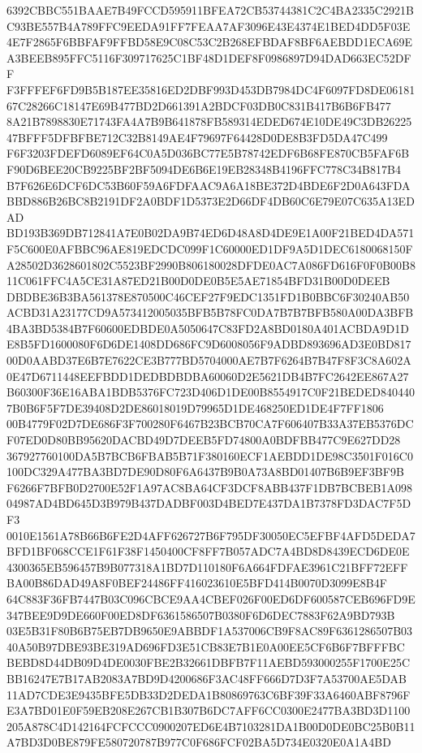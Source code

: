 \documentclass[UTF8,fontset=fandol,zihao=-4,a4paper]{ctexart}
\begin{document}
{{6392CBBC551BAAE7B49FCCD595911BFEA72CB53744381C2C4BA2335C2921BC93BE557B4A789FFC9EEDA91FF7FEAA7AF3096E43E4374E1BED4DD5F03E
4E7F2865F6BBFAF9FFBD58E9C08C53C2B268EFBDAF8BF6AEBDD1ECA69EA3BEEB895FFC5116F309717625C1BF48D1DEF8F0986897D94DAD663EC52DFF
F3FFFEF6FD9B5B187EE35816ED2DBF993D453DB7984DC4F6097FD8DE0618167C28266C18147E69B477BD2D661391A2BDCF03DB0C831B417B6B6FB477
8A21B7898830E71743FA4A7B9B641878FB589314EDED674E10DE49C3DB2622547BFFF5DFBFBE712C32B8149AE4F79697F64428D0DE8B3FD5DA47C499
F6F3203FDEFD6089EF64C0A5D036BC77E5B78742EDF6B68FE870CB5FAF6BF90D6BEE20CB9225BF2BF5094DE6B6E19EB28348B4196FFC778C34B817B4
B7F626E6DCF6DC53B60F59A6FDFAAC9A6A18BE372D4BDE6F2D0A643FDABBD886B26BC8B2191DF2A0BDF1D5373E2D66DF4DB60C6E79E07C635A13EDAD
BD193B369DB712841A7E0B02DA9B74ED6D48A8D4DE9E1A00F21BED4DA571F5C600E0AFBBC96AE819EDCDC099F1C60000ED1DF9A5D1DEC6180068150F
A28502D3628601802C5523BF2990B806180028DFDE0AC7A086FD616F0F0B00B811C061FFC4A5CE31A87ED21B00D0DE0B5E5AE71854BFD31B00D0DEEB
DBDBE36B3BA561378E870500C46CEF27F9EDC1351FD1B0BBC6F30240AB50ACBD31A23177CD9A573412005035BFB5B78FC0DA7B7B7BFB580A00DA3BFB
4BA3BD5384B7F60600EDBDE0A5050647C83FD2A8BD0180A401ACBDA9D1DE8B5FD1600080F6D6DE1408DD686FC9D6008056F9ADBD893696AD3E0BD817
00D0AABD37E6B7E7622CE3B777BD5704000AE7B7F6264B7B47F8F3C8A602A0E47D6711448EEFBDD1DEDBDBDBA60060D2E5621DB4B7FC2642EE867A27
B60300F36E16ABA1BDB5376FC723D406D1DE00B8554917C0F21BEDED8404407B0B6F5F7DE39408D2DE86018019D79965D1DE468250ED1DE4F7FF1806
00B4779F02D7DE686F3F700280F6467B23BCB70CA7F606407B33A37EB5376DCF07ED0D80BB95620DACBD49D7DEEB5FD74800A0BDFBB477C9E627DD28
367927760100DA5B7BCB6FBAB5B71F380160ECF1AEBDD1DE98C3501F016C0100DC329A477BA3BD7DE90D80F6A6437B9B0A73A8BD01407B6B9EF3BF9B
F6266F7BFB0D2700E52F1A97AC8BA64CF3DCF8ABB437F1DB7BCBEB1A09804987AD4BD645D3B979B437DADBF003D4BED7E437DA1B7378FD3DAC7F5DF3
0010E1561A78B66B6FE2D4AFF626727B6F795DF30050EC5EFBF4AFD5DEDA7BFD1BF068CCE1F61F38F1450400CF8FF7B057ADC7A4BD8D8439ECD6DE0E
4300365EB596457B9B077318A1BD7D110180F6A664FDFAE3961C21BFF72EFFBA00B86DAD49A8F0BEF24486FF416023610E5BFD414B0070D3099E8B4F
64C883F36FB7447B03C096CBCE9AA4CBEF026F00ED6DF600587CEB696FD9E347BEE9D9DE660F00ED8DF6361586507B0380F6D6DEC7883F62A9BD793B
03E5B31F80B6B75EB7DB9650E9ABBDF1A537006CB9F8AC89F6361286507B0340A50B97DBE93BE319AD696FD3E51CB83E7B1E0A00EE5CF6B6F7BFFFBC
BEBD8D44DB09D4DE0030FBE2B32661DBFB7F11AEBD593000255F1700E25CBB16247E7B17AB2083A7BD9D4200686F3AC48FF666D7D3F7A53700AE5DAB
11AD7CDE3E9435BFE5DB33D2DEDA1B80869763C6BF39F33A6460ABF8796FE3A7BD01E0F59EB208E267CB1B307B6DC7AFF6CC0300E2477BA3BD3D1100
205A878C4D142164FCFCCC0900207ED6E4B7103281DA1B00D0DE0BC25B0B11A7BD3D0BE879FE580720787B977C0F686FCF02BA5D734E0320E0A1A4BD
}}
\end{document}
